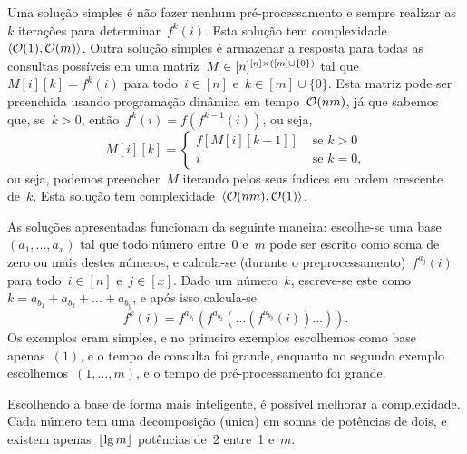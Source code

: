 \documentclass[main.tex]{subfiles}
\begin{document}
Uma solução simples é não fazer nenhum pré-processamento e sempre realizar as~$k$ iterações para determinar~$f^k(i)$. Esta solução tem complexidade~$\langle\mathcal{O}(1),\mathcal{O}(m)\rangle$. Outra solução simples é armazenar a resposta para todas as consultas possíveis em uma matriz~$M \in [n]^{[n] \times ([m] \cup \{0\})}$ tal que~$M[i][k] = f^k(i)$ para todo~$i \in [n]$ e~$k \in [m] \cup \{0\}$. Esta matriz pode ser preenchida usando programação dinâmica em tempo~$\mathcal{O}(nm)$, já que sabemos que, se~$k > 0$, então~$f^k(i) = f(f^{k-1}(i))$, ou seja,
$$M[i][k] = \left\{
	\begin{array}{ll}
		f[M[i][k-1]] & \text{ se $k > 0$} \\
		i & \text{ se $k = 0$,}
	\end{array}
	\right.
$$
ou seja, podemos preencher~$M$ iterando pelos seus índices em ordem crescente de~$k$. Esta solução tem complexidade~$\langle\mathcal{O}(nm), \mathcal{O}(1)\rangle$.

As soluções apresentadas funcionam da seguinte maneira: escolhe-se uma base~$(a_1, \ldots, a_x)$ tal que todo número entre~0 e~$m$ pode ser escrito como soma de zero ou mais destes números, e calcula-se (durante o preprocessamento)~$f^{a_j}(i)$ para todo~$i \in [n]$ e~$j \in [x]$. Dado um número~$k$, escreve-se este como~$k = a_{b_1} + a_{b_2} + \ldots + a_{b_y}$, e após isso calcula-se
$$f^k(i) = f^{a_{b_1}}(f^{a_{b_2}}(\ldots(f^{a_{b_y}}(i))\ldots)).$$
Os exemplos eram simples, e no primeiro exemplos escolhemos como base apenas~$(1)$, e o tempo de consulta foi grande, enquanto no segundo exemplo escolhemos~$(1, \ldots, m)$, e o tempo de pré-processamento foi grande.

Escolhendo a base de forma mais inteligente, é possível melhorar a complexidade. Cada número tem uma decomposição (única) em somas de potências de dois, e existem apenas~$\lfloor\lg m\rfloor$ potências de~2 entre~1 e~$m$.
\end{document}
